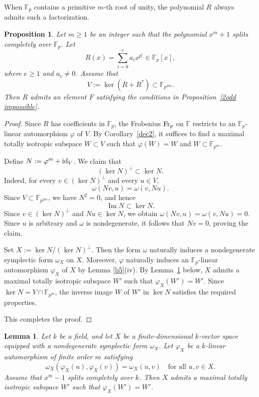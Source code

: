 \documentclass[12pt,a4paper]{amsart}
\newtheorem{lemma}[theorem]{Lemma}
\newtheorem{proposition}[theorem]{Proposition}
\theoremstyle{definition}
\def\F{{\mathbb F}}
\theoremstyle{remark}
\DeclareMathOperator{\Ima}{Im}
\begin{document}
When $\F_p$ contains a primitive $m$-th root of unity, the polynomial $R$ always admits such a factorization. 
\begin{proposition}\label{2odd impossible 2}
Let $m\geq1$ be an integer such that the polynomial $x^m+1$ splits completely over $\F_p$. 
Let 
\[
R(x)=\sum_{i=0}^ea_ix^{p^i}\in\F_p[x], 
\]
  where $e\geq1$ and $a_e\neq0$. Assume that 
  \[
  V:=\ker(R+R^\ast)\subset \F_{p^{2m}}. 
  \]
Then $R$ admits an element $F$ satisfying the conditions in Proposition~\ref{2odd impossible}. 
\end{proposition}
\begin{proof}
Since $R$ has coefficients in $\F_p$, the Frobenius ${\rm Fr}_p$ on $\F$ restricts to an $\F_p$-linear automorphism $\varphi$ of $V$. 
By Corollary~\ref{dec2}, it suffices to find a maximal totally isotropic subspace $W\subset V$ such that $\varphi(W)=W$ and $W\subset \F_{p^m}$. 

Define $N:=\varphi^m+{\rm id}_V$. We claim that 
\[
(\ker N)^\perp\subset\ker N. 
\]
Indeed, for every $v\in (\ker N)^\perp$ and every $u\in V$, 
\[
\omega(Nv,u)=\omega(v,Nu). 
\]
Since $V\subset\F_{p^{2m}}$, we have $N^2=0$, 
and hence 
\[
\Ima N\subset\ker N. 
\]
Since $v \in (\ker N)^{\perp}$ and 
$Nu \in \ker N$, we obtain $\omega(Nv,u)=\omega(v,Nu)=0$. Since $u$ is arbitrary and $\omega$ is nondegenerate, it follows that $Nv=0$, proving the claim. 

Set $X:=\ker N/(\ker N)^\perp$. Then the form $\omega$ naturally induces a nondegenerate symplectic form $\omega_X$ on $X$. Moreover, $\varphi$ naturally induces an $\F_p$-linear automorphism $\varphi_X$ of $X$ by Lemma \ref{b5}(iv). 
By Lemma~\ref{mti stable} below, $X$ admits a maximal totally isotropic subspace $W'$ such that $\varphi_X(W')=W'$. Since $\ker N=V\cap\F_{p^m}$, the inverse image $W$ of $W'$ in $\ker N$ satisfies 
the required properties. 

This completes the proof. 
\end{proof}
\begin{lemma}\label{mti stable}
Let $k$ be a field, and let $X$ be a finite-dimensional $k$-vector space equipped with a nondegenerate symplectic form $\omega_X$. Let $\varphi_X$ be a $k$-linear automorphism of finite order $m$ satisfying 
\[
\omega_X(\varphi_X(u), \varphi_X(v))=\omega_X(u, v)\quad\text{for all }u,v\in X. 
\]
    Assume that $x^m-1$ splits completely over $k$. Then $X$ admits a maximal totally isotropic subspace $W'$ such that $\varphi_X(W')=W'$. 
\end{lemma}
\end{document}
